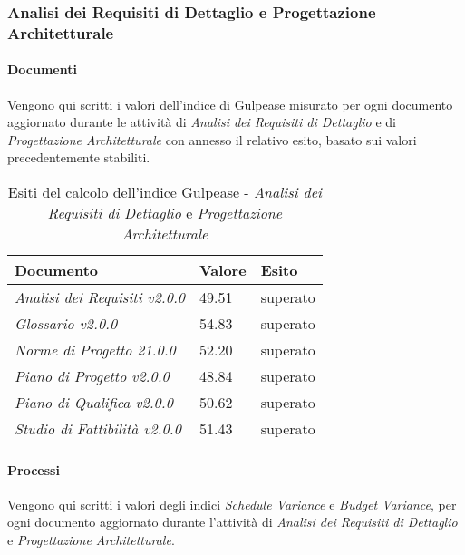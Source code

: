     \subsubsection{Analisi dei Requisiti di Dettaglio e Progettazione Architetturale}
    \paragraph{Documenti} \Spazio
    Vengono qui scritti i valori dell'indice di Gulpease misurato per ogni documento aggiornato durante le attività di \textit{Analisi dei Requisiti di Dettaglio} e di \emph{Progettazione Architetturale} con annesso il relativo esito, basato sui valori precedentemente stabiliti.
    
    \begin{table}[H]
    	\centering
    	\begin{tabular}{|C{7cm}|C{2cm}|C{2cm}|}
    		\hline
    		\textbf{Documento} & \textbf{Valore} & \textbf{Esito}  \\
    		\hline
    		\textit{Analisi dei Requisiti v2.0.0} & 49.51 & superato \\
    		\hline
    		\textit{Glossario v2.0.0} & 54.83 & superato \\
    		\hline
    		\textit{Norme di Progetto 21.0.0} & 52.20 & superato \\
    		\hline
    		\textit{Piano di Progetto v2.0.0} & 48.84 & superato \\
    		\hline
    		\textit{Piano di Qualifica v2.0.0} & 50.62 & superato \\
    		\hline
    		\textit{Studio di Fattibilità v2.0.0} & 51.43 & superato \\
    		\hline
    		
    	\end{tabular}
    	\caption{Esiti del calcolo dell'indice Gulpease - \textit{Analisi dei Requisiti di Dettaglio} e \textit{Progettazione Architetturale}}
    \end{table}
    \paragraph{Processi} \Spazio
    Vengono qui scritti i valori degli indici \textit{Schedule Variance} e \textit{Budget Variance}, per ogni documento aggiornato durante l'attività di \textit{Analisi dei Requisiti di Dettaglio} e \textit{Progettazione Architetturale}. 
    
